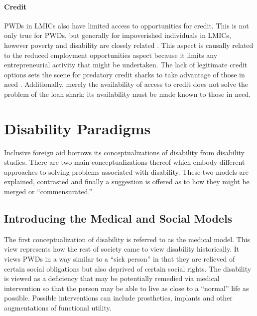\documentclass[a4paper]{article}
\begin{document}
\paragraph{Credit}

PWDs in LMICs also have limited access to opportunities for credit. This is
not only true for PWDs, but generally for impoverished individuals in LMICs,
however poverty and disability are closely related
\citep{palmer2011disability}. This aspect is causally related to the reduced
employment opportunities aspect because it limits any entrepreneurial activity
that might be undertaken. The lack of legitimate credit options sets the scene
for predatory credit sharks to take advantage of those in need
\citep{beisland2017exploring}. Additionally, merely the availability of access
to credit does not solve the problem of the loan shark; its availability must
be made known to those in need.

\newpage
\section{Disability Paradigms}

Inclusive foreign aid borrows its conceptualizations of disability from
disability studies. There are two main conceptualizations thereof which embody
different approaches to solving problems associated with disability. These two
models are explained, contrasted and finally a suggestion is offered as to how
they might be merged or ``commensurated.''

\subsection{Introducing the Medical and Social Models} 
\label{models}

The first conceptualization of disability is referred to as the medical model.
This view represents how the rest of society came to view disability
historically. It views PWDs in a way similar to a ``sick person'' in that they
are relieved of certain social obligations but also deprived of certain social
rights. The disability is viewed as a deficiency that may be potentially
remedied via medical intervention so that the person may be able to live as
close to a ``normal'' life as possible. Possible interventions can include
prosthetics, implants and other augmentations of functional utility.
\end{document}
